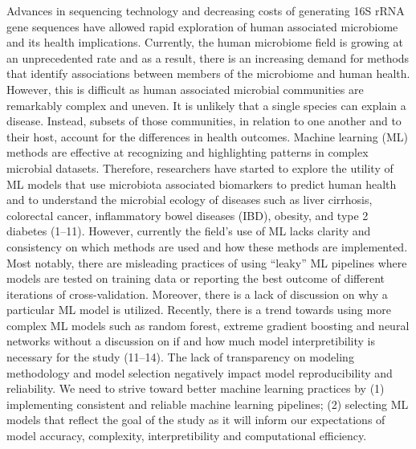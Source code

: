 \documentclass[11pt,]{article}
\begin{document}
Advances in sequencing technology and decreasing costs of generating 16S
rRNA gene sequences have allowed rapid exploration of human associated
microbiome and its health implications. Currently, the human microbiome
field is growing at an unprecedented rate and as a result, there is an
increasing demand for methods that identify associations between members
of the microbiome and human health. However, this is difficult as human
associated microbial communities are remarkably complex and uneven. It
is unlikely that a single species can explain a disease. Instead,
subsets of those communities, in relation to one another and to their
host, account for the differences in health outcomes. Machine learning
(ML) methods are effective at recognizing and highlighting patterns in
complex microbial datasets. Therefore, researchers have started to
explore the utility of ML models that use microbiota associated
biomarkers to predict human health and to understand the microbial
ecology of diseases such as liver cirrhosis, colorectal cancer,
inflammatory bowel diseases (IBD), obesity, and type 2 diabetes (1--11).
However, currently the field's use of ML lacks clarity and consistency
on which methods are used and how these methods are implemented. Most
notably, there are misleading practices of using ``leaky'' ML pipelines
where models are tested on training data or reporting the best outcome
of different iterations of cross-validation. Moreover, there is a lack
of discussion on why a particular ML model is utilized. Recently, there
is a trend towards using more complex ML models such as random forest,
extreme gradient boosting and neural networks without a discussion on if
and how much model interpretibility is necessary for the study (11--14).
The lack of transparency on modeling methodology and model selection
negatively impact model reproducibility and reliability. We need to
strive toward better machine learning practices by (1) implementing
consistent and reliable machine learning pipelines; (2) selecting ML
models that reflect the goal of the study as it will inform our
expectations of model accuracy, complexity, interpretibility and
computational efficiency.
\end{document}
